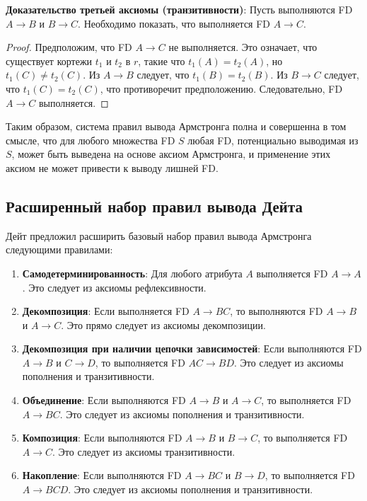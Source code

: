 \documentclass[a4paper,12pt]{article}
\begin{document}
\textbf{Доказательство третьей аксиомы (транзитивности)}: Пусть выполняются FD $A \rightarrow B$ и $B \rightarrow C$. Необходимо показать, что выполняется FD $A \rightarrow C$.
\begin{proof}
    Предположим, что FD $A \rightarrow C$ не выполняется. Это означает, что существует кортежи $t_1$ и $t_2$ в $r$, такие что $t_1(A) = t_2(A)$, но $t_1(C) \neq t_2(C)$. Из $A \rightarrow B$ следует, что $t_1(B) = t_2(B)$. Из $B \rightarrow C$ следует, что $t_1(C) = t_2(C)$, что противоречит предположению. Следовательно, FD $A \rightarrow C$ выполняется.
\end{proof}

Таким образом, система правил вывода Армстронга полна и совершенна в том смысле, что для любого множества FD $S$ любая FD, потенциально выводимая из $S$, может быть выведена на основе аксиом Армстронга, и применение этих аксиом не может привести к выводу лишней FD.

\subsection{Расширенный набор правил вывода Дейта}

Дейт предложил расширить базовый набор правил вывода Армстронга следующими правилами:

\begin{enumerate}
    \item \textbf{Самодетерминированность}: Для любого атрибута $A$ выполняется FD $A \rightarrow A$. Это следует из аксиомы рефлексивности.
    \item \textbf{Декомпозиция}: Если выполняется FD $A \rightarrow BC$, то выполняются FD $A \rightarrow B$ и $A \rightarrow C$. Это прямо следует из аксиомы декомпозиции.
    \item \textbf{Декомпозиция при наличии цепочки зависимостей}: Если выполняются FD $A \rightarrow B$ и $C \rightarrow D$, то выполняется FD $AC \rightarrow BD$. Это следует из аксиомы пополнения и транзитивности.
    \item \textbf{Объединение}: Если выполняются FD $A \rightarrow B$ и $A \rightarrow C$, то выполняется FD $A \rightarrow BC$. Это следует из аксиомы пополнения и транзитивности.
    \item \textbf{Композиция}: Если выполняются FD $A \rightarrow B$ и $B \rightarrow C$, то выполняется FD $A \rightarrow C$. Это следует из аксиомы транзитивности.
    \item \textbf{Накопление}: Если выполняются FD $A \rightarrow BC$ и $B \rightarrow D$, то выполняется FD $A \rightarrow BCD$. Это следует из аксиомы пополнения и транзитивности.
\end{enumerate}
\end{document}
